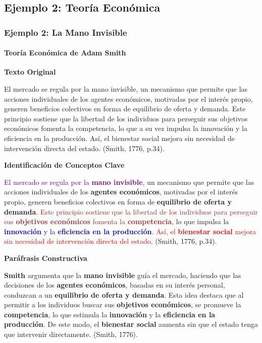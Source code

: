 \documentclass[aspectratio=169]{beamer}
\begin{document}
\subsection{Ejemplo 2: Teoría Económica}

\begin{frame}[allowframebreaks]
	\frametitle{Ejemplo 2: La Mano Invisible}
	\framesubtitle{Teoría Económica de Adam Smith}
	
	\textbf{Texto Original}
	\begin{block}{}
		\small
		El mercado se regula por la mano invisible, un mecanismo que permite que las acciones individuales de los agentes económicos, motivadas por el interés propio, generen beneficios colectivos en forma de equilibrio de oferta y demanda. Este principio sostiene que la libertad de los individuos para perseguir sus objetivos económicos fomenta la competencia, lo que a su vez impulsa la innovación y la eficiencia en la producción. Así, el bienestar social mejora sin necesidad de intervención directa del estado. (Smith, 1776, p.34).
	\end{block}
	
	\framebreak
	
	\textbf{Identificación de Conceptos Clave}
	\begin{block}{}
		\small
		\textcolor{purple}{El mercado se regula por la \textbf{mano invisible}}, un mecanismo que permite que las acciones individuales de los \textbf{agentes económicos}, motivadas por el interés propio, generen beneficios colectivos en forma de \textbf{equilibrio de oferta y demanda}. \textcolor{brown}{Este principio sostiene que la libertad de los individuos para perseguir sus \textbf{objetivos económicos} fomenta la \textbf{competencia}}, lo que impulsa la \textcolor{blue}{\textbf{innovación} y la \textbf{eficiencia en la producción}}. \textcolor{red}{Así, el \textbf{bienestar social} mejora sin necesidad de intervención directa del estado}. (Smith, 1776, p.34).
	\end{block}
	
	\framebreak
	
	\textbf{Paráfrasis Constructiva}
	\begin{block}{}
		\small
		\textbf{Smith} argumenta que la \textbf{mano invisible} guía el mercado, haciendo que las decisiones de los \textbf{agentes económicos}, basadas en su interés personal, conduzcan a un \textbf{equilibrio de oferta y demanda}. Esta idea destaca que al permitir a los individuos buscar sus \textbf{objetivos económicos}, se promueve la \textbf{competencia}, lo que estimula la \textbf{innovación} y la \textbf{eficiencia en la producción}. De este modo, el \textbf{bienestar social} aumenta sin que el estado tenga que intervenir directamente. (Smith, 1776).
	\end{block}
\end{frame}
\end{document}

